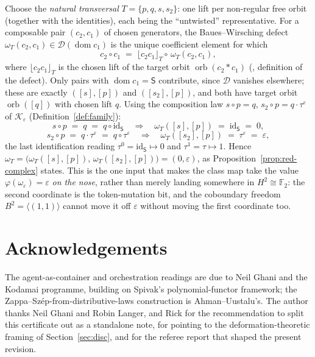 \documentclass[11pt]{amsart}
\theoremstyle{definition}
\theoremstyle{remark}
\newcommand{\dom}{\operatorname{dom}}
\newcommand{\orb}{\operatorname{orb}}
\newcommand{\id}{\mathrm{id}}
\newcommand{\K}{\mathcal{K}}
\newcommand{\Sup}{\mathsf{S}}
\newcommand{\dir}{\mathcal{D}}
\newcommand{\FF}{\mathbb{F}_2}
\begin{document}
Choose the \emph{natural transversal} $T=\{p,q,s,s_2\}$: one lift per non-regular free orbit
(together with the identities), each being the ``untwisted'' representative. For a composable pair
$(c_2,c_1)$ of chosen generators, the Baues--Wirsching defect $\omega_T(c_2,c_1)\in\dir(\dom c_1)$ is
the unique coefficient element for which
\[
  c_2\circ c_1 \;=\; \lfloor c_2c_1\rfloor_T \circ\, \omega_T(c_2,c_1),
\]
where $\lfloor c_2c_1\rfloor_T$ is the chosen lift of the target orbit $\orb(c_2\ast c_1)$
(\cite{gobstr}, definition of the defect). Only pairs with $\dom c_1=\Sup$ contribute, since
$\dir$ vanishes elsewhere; these are exactly $([s],[p])$ and $([s_2],[p])$, and both have target
orbit $\orb([q])$ with chosen lift $q$. Using the composition law
$s\circ p=q$, $s_2\circ p=q\cdot\tau^{\varepsilon}$ of $\K_\varepsilon$ (Definition~\ref{def:family}):
\[
  s\circ p \;=\; q \;=\; q\circ\id_\Sup
  \quad\Longrightarrow\quad
  \omega_T([s],[p]) \;=\; \id_\Sup \;=\; 0,
\]
\[
  s_2\circ p \;=\; q\cdot\tau^{\varepsilon} \;=\; q\circ\tau^{\varepsilon}
  \quad\Longrightarrow\quad
  \omega_T([s_2],[p]) \;=\; \tau^{\varepsilon} \;=\; \varepsilon,
\]
the last identification reading $\tau^0=\id_\Sup\mapsto0$ and $\tau^1=\tau\mapsto1$. Hence
$\omega_T=\big(\omega_T([s],[p]),\,\omega_T([s_2],[p])\big)=(0,\varepsilon)$, as
Proposition~\ref{prop:red-complex} states. This is the one input that makes the class map take the
value $\varphi(\omega_\varepsilon)=\varepsilon$ \emph{on the nose}, rather than merely landing
somewhere in $H^2\cong\FF$: the second coordinate is the token-mutation bit, and the coboundary
freedom $B^2=\langle(1,1)\rangle$ cannot move it off $\varepsilon$ without moving the first coordinate
too.

\section*{Acknowledgements}
The agent-as-container and orchestration readings are due to Neil Ghani and the Kodamai programme,
building on Spivak's polynomial-functor framework; the Zappa--Sz\'ep-from-distributive-laws construction
is Ahman--Uustalu's. The author thanks Neil Ghani and Robin Langer, and Rick for the recommendation to
split this certificate out as a standalone note, for pointing to the deformation-theoretic framing of
Section~\ref{sec:disc}, and for the referee report that shaped the present revision.
\end{document}
